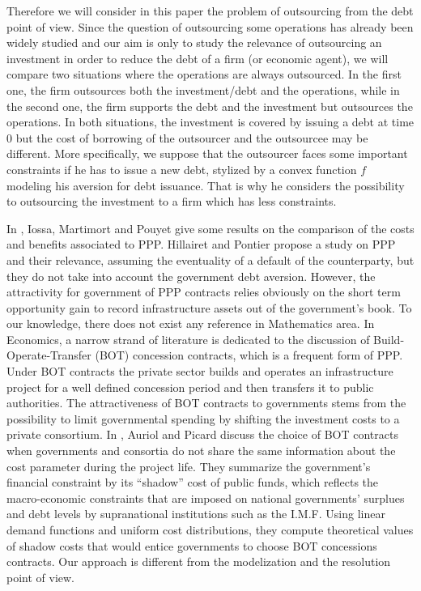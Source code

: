 \documentclass{svjour3}
\begin{document}
Therefore we will consider in this paper the problem of outsourcing from the debt point of view. Since the question of outsourcing some operations has already been widely studied and our aim is only to study the relevance of outsourcing an investment in order to reduce the debt of a firm (or economic agent), we will compare two situations where the operations are always outsourced. In the first one, the firm outsources both the investment/debt and the operations, while in the second one, the firm supports the debt and the investment but outsources the operations. In both situations, the investment is covered by issuing a debt at time 0 but the cost of borrowing of the outsourcer and the outsourcee  may be different. More specifically, we suppose that the outsourcer faces some important constraints if he has to issue a new debt, stylized by  a convex function $f$ modeling his aversion for debt issuance. That is why he considers the possibility  to outsourcing the investment to a firm which has less constraints.  

In  \cite{IMP}, Iossa, Martimort and Pouyet give some results on the comparison of the costs and benefits associated to PPP. Hillairet and Pontier \cite{CaroMo} propose a study on PPP  and their relevance,  assuming the eventuality of a default of the counterparty, but  they do not take into account the government debt aversion. However,  the attractivity for government of PPP contracts relies obviously on  the short term opportunity gain to record infrastructure assets out of the government's book.  To our knowledge, there   does not exist any
reference in Mathematics area.   In Economics, a narrow strand of literature is  dedicated to the discussion of Build-Operate-Transfer (BOT) concession  contracts, which is a frequent form of PPP.  Under BOT contracts the private sector builds and operates an infrastructure project for a well defined concession period and then transfers it to public authorities. The attractiveness of  BOT contracts to governments stems from the possibility to limit governmental spending by shifting the investment costs to a private consortium.  
In \cite{AuPi1}, Auriol and Picard discuss the choice of BOT contracts when governments and consortia do not share the same information about the cost parameter during the project life. They summarize the government's financial constraint by its ``shadow'' cost of public funds, which reflects the macro-economic constraints that are imposed on national governments' surplues and debt levels by supranational institutions such as the I.M.F. Using linear demand functions and uniform cost distributions, they compute theoretical values of shadow costs that would entice governments to choose BOT concessions contracts.  
Our approach is different from the modelization and the resolution point of view. 
\end{document}
